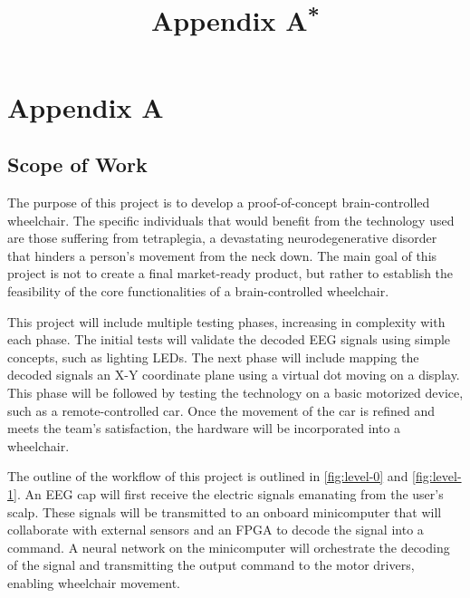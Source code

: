 \documentclass[conference]{IEEEtran}
\begin{document}
\clearpage
\twocolumn

\renewcommand{\thesubsection}{A.\Alph{subsection}}
\title{Appendix A{\footnotesize \textsuperscript{*}}}
\section*{\textbf{Appendix A}}
    \setcounter{subsection}{0}
    \subsection{Scope of Work}
    The purpose of this project is to develop a proof-of-concept brain-controlled wheelchair. The specific individuals that would benefit from the technology used are those suffering from tetraplegia, a devastating neurodegenerative disorder that hinders a person's movement from the neck down. The main goal of this project is not to create a final market-ready product, but rather to establish the feasibility of the core functionalities of a brain-controlled wheelchair. 
    
    This project will include multiple testing phases, increasing in complexity with each phase. The initial tests will validate the decoded EEG signals using simple concepts, such as lighting LEDs. The next phase will include mapping the decoded signals an X-Y coordinate plane using a virtual dot moving on a display. This phase will be followed by testing the technology on a basic motorized device, such as a remote-controlled car. Once the movement of the car is refined and meets the team's satisfaction, the hardware will be incorporated into a wheelchair.

    The outline of the workflow of this project is outlined in \ref{fig:level-0} and \ref{fig:level-1}. An EEG cap will first receive the electric signals emanating from the user's scalp. These signals will be transmitted to an onboard minicomputer that will collaborate with external sensors and an FPGA to decode the signal into a command. A neural network on the minicomputer will orchestrate the decoding of the signal and transmitting the output command to the motor drivers, enabling wheelchair movement. 
\end{document}

